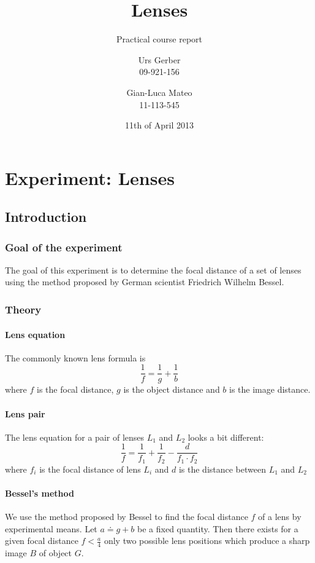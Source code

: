 \documentclass{scrreprt}
\author{Urs Gerber\\09-921-156 \and Gian-Luca Mateo\\11-113-545}
\date{11th of April 2013}
\title{Lenses}
\subtitle{Practical course report}
\begin{document}
\maketitle

\tableofcontents
\newpage

\chapter{Experiment: Lenses}

\section{Introduction}

\subsection{Goal of the experiment}
The goal of this experiment is to determine the focal distance of a set of lenses using the method proposed by German scientist Friedrich Wilhelm Bessel.

\subsection{Theory}

\subsubsection{Lens equation}
The commonly known lens formula is
\begin{equation}
\frac{1}{f} = \frac{1}{g} + \frac{1}{b}
\end{equation}
where $f$ is the focal distance, $g$ is the object distance and $b$ is the image distance.

\subsubsection{Lens pair}
The lens equation for a pair of lenses $L_1$ and $L_2$ looks a bit different:
\begin{equation}
\frac{1}{f}= \frac{1}{f_1} + \frac{1}{f_2} - \frac{d}{f_1 \cdot f_2}
\end{equation}
where $f_i$ is the focal distance of lens $L_i$ and $d$ is the distance between $L_1$ and $L_2$

\subsubsection{Bessel's method}
We use the method proposed by Bessel to find the focal distance $f$ of a lens by experimental means. Let $a \doteq g + b$ be a fixed quantity. Then there exists for a given focal distance $f < \frac{a}{4}$ only two possible lens positions which produce a sharp image $B$ of object $G$. 
\end{document}

